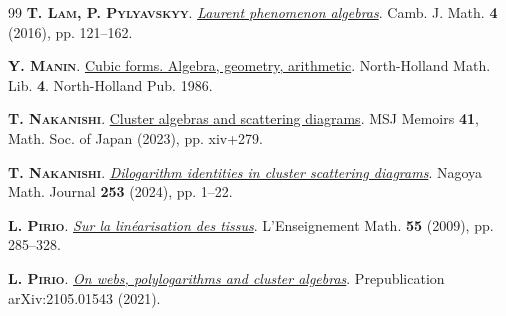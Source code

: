 \documentclass[11pt]{amsart}
\newcommand{\mk}{\medskip}
\begin{document}
\begin{thebibliography}{99}
{\scshape  \bf  T. Lam, P. Pylyavskyy}. 
\href{https://dx.doi.org/10.4310/CJM.2016.v4.n1.a2}{\it Laurent phenomenon algebras}. Camb. J. Math. {\bf 4} (2016), pp. 121--162.
\mk 








{\scshape  \bf  Y. Manin}. 
\href{https://www.sciencedirect.com/bookseries/north-holland-mathematical-library/vol/4/suppl/C}{Cubic forms. Algebra, geometry, arithmetic}.  North-Holland Math. Lib. {\bf 4}. North-Holland Pub. 1986.
\mk 




{\scshape  \bf  T. Nakanishi}. 
\href{https://doi.org/10.1142/e073}{Cluster algebras and scattering diagrams}.   MSJ Memoirs {\bf 41}, 
Math. Soc. of Japan (2023), pp.  {xiv+279}.
 \mk 
 
{\scshape  \bf  T. Nakanishi}. 
\href{https://doi.org/10.1017/nmj.2023.15}{\it Dilogarithm identities in cluster scattering diagrams}.  Nagoya Math. Journal {\bf 253 } (2024), pp. 1--22.
 \mk 



{\scshape  \bf L. Pirio}.  
\href{https://ems.press/content/serial-article-files/44191}{\it Sur la lin\'earisation des tissus}.  L'Enseignement Math. {\bf 55} (2009), pp.  285--328.
\mk

{\scshape  \bf L. Pirio}.  
   \href{https://arxiv.org/abs/2105.01543}
   {\it On  webs, polylogarithms and cluster algebras}.  
Prepublication   arXiv:2105.01543 (2021).
\mk 




\end{thebibliography}
\end{document}
